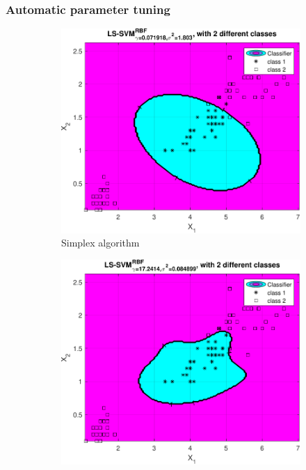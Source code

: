 \documentclass{article}
\begin{document}
        \subsubsection{Automatic parameter tuning}
            \begin{figure}[h]
                 \centering
                 \hspace{0.05\textwidth}
                 \begin{subfigure}[b]{0.4\textwidth}
                     \centering
                     \includegraphics[width=\textwidth]{Assignment 1/figures/rbf_simplex_optimal.pdf}
                    \caption{Simplex algorithm}
                     \label{fig:rbf_simplex_tuned}
                 \end{subfigure}
                 \hfill
                 \begin{subfigure}[b]{0.4\textwidth}
                     \centering
                     \includegraphics[width=\textwidth]{Assignment 1/figures/rbf_gridsearch_optimal.pdf}

\end{subfigure}
\end{figure}
\end{document}
